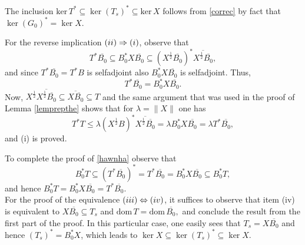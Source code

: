 \documentclass[10pt,a4paper]{amsart}
\makeatletter
\newcommand{\D}{\mathrm{dom}\,}
\newcommand{\DT}{\mathrm{dom}\,T }
\newcommand{\adj}{^*}
\newcommand{\half}{^{\frac{1}{2}}}
\newcommand{\ifaf}{\Leftrightarrow}
\newcommand{\inclu}{\subseteq}
\newcommand{\kerr}{\mathrm{ker}\,}
\newcommand{\n}{\|}
\renewenvironment{proof}[1][\proofname]{%
   \par\pushQED{\qed}\normalfont%
   \topsep6\p@\@plus6\p@\relax
   \trivlist\item[\hskip\labelsep\bfseries#1\@addpunct{.}]%
   \ignorespaces
}{%
   \popQED\endtrivlist\@endpefalse
}
\newcommand{\ts}{T_s}
\newcommand{\tstar}{T^{*}}
\makeatother
\begin{document}
\begin{proof}
                 \hspace*{0.4cm}  The inclusion $\kerr T\adj \inclu \ker (\ts)\adj  \inclu \kerr X$ follows  from \eqref{correc}  by fact that  $\ker (G_0)\adj= \ker X$.


               For the reverse implication $\rm(ii) \Rightarrow (i)$, observe that
   $$
   \tstar \overline{B_0} \inclu B_0\adj X \overline{B_0} \inclu (X\half \overline{B_0})\adj \overline{X\half \overline{B_0}},
   $$
    and since  $ \tstar \overline{B_0} =\tstar B $ is selfadjoint also   $B_0\adj X \overline{B_0}$    is   selfadjoint. Thus,
   \begin{equation}\label{9rib}
      \tstar \overline{B_0}= B_0\adj X \overline{B_0}.
  \end{equation}
  Now, $X\half \overline{X\half \overline{B_0} } \inclu \overline{X\overline{B_0}} \inclu T$ and the same argument that was used in the proof of  Lemma \ref{lemprepthe} shows that for  $\lambda = \n X \n $  one has
  $$
  \tstar T \leq \lambda  (X\half B)\adj \overline{X\half \overline{B_0}} = \lambda  B_0\adj X\overline{B_0}  = \lambda \tstar \overline{B_0},
  $$
  and (i) is proved.


To complete the proof of  \eqref{hawnha}  observe that
 $$
    B_0\adj T \inclu (\tstar \overline{B_0})\adj= \tstar \overline{B_0} = B_0\adj X \overline{B_0} \inclu B_0\adj T,
 $$
  and hence $B_0\adj T= B_0\adj X \overline{B_0} =\tstar \overline{B_0}.$\\
   \hspace*{0.4cm}  For the proof of the equivalence $\rm(iii) \ifaf (iv)$, it suffices to observe that item (iv) is   equivalent to  $
  X \overline{B_0} \inclu \ts  $ and $ \DT = \D \overline{B_0},$ and conclude the result from the first part of the proof. In this particular case, one easily sees that $\ts =X \overline{B_0} $ and hence $(\ts)\adj = B_0\adj X$, which leads to  $\ker X \inclu \ker  (\ts)\adj \inclu \ker X.$
\end{proof}
\end{document}
